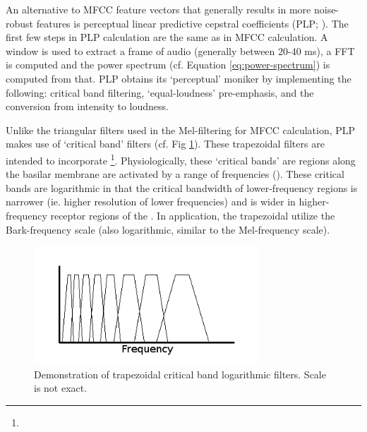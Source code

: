 An alternative to MFCC feature vectors that generally results in more noise-robust features is perceptual linear predictive cepstral coefficients (PLP; \cite{hermansky:85}).  The first few steps in PLP calculation are the same as in MFCC calculation.  A window is used to extract a frame of audio (generally between 20-40 ms), a FFT is computed and the power spectrum (cf. Equation \ref{eq:power-spectrum}) is computed from that.  PLP obtains its `perceptual' moniker by implementing the following: critical band filtering, `equal-loudness' pre-emphasis, and the conversion from intensity to loudness.  

Unlike the triangular filters used in the Mel-filtering for MFCC calculation, PLP makes use of `critical band' filters (cf. Fig \ref{fig:filt-cb}).  These trapezoidal filters are intended to incorporate \DIFdelbegin {}\DIFdelend \DIFaddbegin {}\footnote{}\DIFaddend . Physiologically, these `critical bands' are regions \DIFdelbegin {}\DIFdelend along the basilar membrane \DIFdelbegin {}\DIFdelend \DIFaddbegin {}\DIFaddend are activated by \DIFdelbegin \DIFdel{, }\DIFdelend \DIFaddbegin {}\DIFaddend a range of frequencies (\cite{fletcher:40}).  These critical bands are logarithmic in that the critical bandwidth of lower-frequency regions is narrower (ie. higher resolution of lower frequencies) and is wider in higher-frequency receptor regions of the \DIFdelbegin {}\DIFdelend \DIFaddbegin {}\DIFaddend .  In application, the trapezoidal \DIFdelbegin {}\DIFdelend \DIFaddbegin {}\DIFaddend utilize the Bark-frequency scale (also logarithmic, similar to the Mel-frequency scale).

\begin{figure}[h]
\centering
\includegraphics[width=0.75\textwidth]{figure/filt-cb.png}
\caption{Demonstration of trapezoidal critical band logarithmic filters. Scale is not exact.}\label{fig:filt-cb}
\end{figure}

